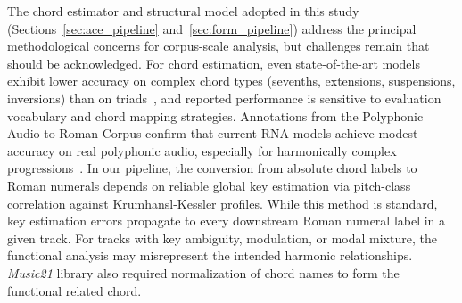 \documentclass{article}
\begin{document}


The chord estimator and structural model adopted in this study (Sections~\ref{sec:ace_pipeline} and~\ref{sec:form_pipeline}) address the principal methodological concerns for corpus-scale analysis, but challenges remain that should be acknowledged. For chord estimation, even state-of-the-art models exhibit lower accuracy on complex chord types (sevenths, extensions, suspensions, inversions) than on triads~\citep{pauwels2013evaluating}, and reported performance is sensitive to evaluation vocabulary and chord mapping strategies. Annotations from the Polyphonic Audio to Roman Corpus confirm that current RNA models achieve modest accuracy on real polyphonic audio, especially for harmonically complex progressions~\citep{poppe2025polyphonic}. In our pipeline, the conversion from absolute chord labels to Roman numerals depends on reliable global key estimation via pitch-class correlation against Krumhansl-Kessler profiles. While this method is standard, key estimation errors propagate to every downstream Roman numeral label in a given track. For tracks with key ambiguity, modulation, or modal mixture, the functional analysis may misrepresent the intended harmonic relationships. \textit{Music21} library also required normalization of chord names to form the functional related chord. 
\end{document}
